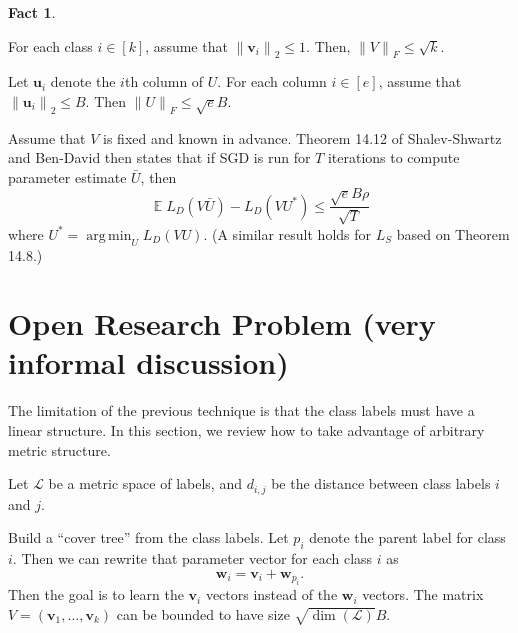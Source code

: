\documentclass[10pt]{article}
\theoremstyle{definition}
\newtheorem{fact}{Fact}
\DeclareMathOperator{\E}{\mathbb E}
\DeclareMathOperator*{\argmin}{arg\,min}
\newcommand{\vv}{\mathbf v}
\newcommand{\uu}{\mathbf u}
\newcommand{\w}{\mathbf w}
\newcommand{\ltwo}[1]{{\lVert {#1} \rVert}_2}
\newcommand{\lF}[1]{{\lVert {#1} \rVert}_F}
\newcommand{\dist}[2]{d_{{#1},{#2}}}
\begin{document}
\begin{fact}
    \begin{enumerate*}[label=(\roman*)]
        \item
    For each class $i \in [k]$, assume that $\ltwo{\vv_i} \le 1$.
    Then, $\lF{V} \le \sqrt k$.
        \item
    Let $\uu_i$ denote the $i$th column of $U$.
    For each column $i \in [e]$, assume that $\ltwo{\uu_i} \le B$.
    Then $\lF{U} \le \sqrt eB$.
    \end{enumerate*}
\end{fact}

\noindent
Assume that $V$ is fixed and known in advance.
Theorem 14.12 of Shalev-Shwartz and Ben-David then states that if SGD is run for $T$ iterations to compute parameter estimate $\bar U$,
then
\begin{equation}
    \E L_D(V\bar U) - L_D(VU^*) \le \frac {\sqrt eB\rho}{\sqrt T}
\end{equation}
where $U^* = \argmin_U L_D(VU)$.
(A similar result holds for $L_S$ based on Theorem 14.8.)


\newpage
\section{Open Research Problem (very informal discussion)}

The limitation of the previous technique is that the class labels must have a linear structure.
In this section, we review how to take advantage of arbitrary metric structure.

Let $\mathcal L$ be a metric space of labels,
and $\dist i j$ be the distance between class labels $i$ and $j$.

Build a ``cover tree'' from the class labels.
Let $p_i$ denote the parent label for class $i$.
Then we can rewrite that parameter vector for each class $i$ as
\begin{equation}
    \w_i = \vv_i + \w_{p_i}
    .
\end{equation}
Then the goal is to learn the $\vv_i$ vectors instead of the $\w_i$ vectors.
The matrix $V=(\vv_1,...,\vv_k)$ can be bounded to have size $\sqrt{\dim(\mathcal L)}B$.
\end{document}
